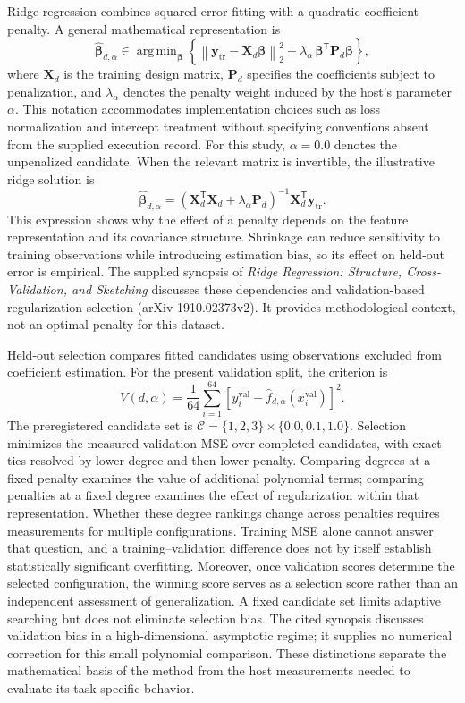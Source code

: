 \documentclass[11pt]{article}
\begin{document}
Ridge regression combines squared-error fitting with a quadratic coefficient penalty. A general mathematical representation is
\[
\widehat{\boldsymbol{\beta}}_{d,\alpha}
 \in \mathop{\mathrm{arg\,min}}_{\boldsymbol{\beta}}
 \left\{
 \left\|\mathbf{y}_{\mathrm{tr}}
       -\mathbf{X}_d\boldsymbol{\beta}\right\|_2^2
 +\lambda_{\alpha}\,
       \boldsymbol{\beta}^{\mathsf T}
       \mathbf{P}_d\boldsymbol{\beta}
 \right\},
\]
where \(\mathbf{X}_d\) is the training design matrix, \(\mathbf{P}_d\) specifies the coefficients subject to penalization, and \(\lambda_{\alpha}\) denotes the penalty weight induced by the host's parameter \(\alpha\). This notation accommodates implementation choices such as loss normalization and intercept treatment without specifying conventions absent from the supplied execution record. For this study, \(\alpha=0.0\) denotes the unpenalized candidate. When the relevant matrix is invertible, the illustrative ridge solution is
\[
\widehat{\boldsymbol{\beta}}_{d,\alpha}
 = \left(\mathbf{X}_d^{\mathsf T}\mathbf{X}_d
              +\lambda_{\alpha}\mathbf{P}_d\right)^{-1}
       \mathbf{X}_d^{\mathsf T}\mathbf{y}_{\mathrm{tr}}.
\]
This expression shows why the effect of a penalty depends on the feature representation and its covariance structure. Shrinkage can reduce sensitivity to training observations while introducing estimation bias, so its effect on held-out error is empirical. The supplied synopsis of \emph{Ridge Regression: Structure, Cross-Validation, and Sketching} discusses these dependencies and validation-based regularization selection (arXiv 1910.02373v2). It provides methodological context, not an optimal penalty for this dataset.

Held-out selection compares fitted candidates using observations excluded from coefficient estimation. For the present validation split, the criterion is
\[
V(d,\alpha)
 = \frac{1}{64}\sum_{i=1}^{64}
 \left[y_i^{\mathrm{val}}
       -\widehat f_{d,\alpha}(x_i^{\mathrm{val}})\right]^2.
\]
The preregistered candidate set is
\(\mathcal{C}=\{1,2,3\}\times\{0.0,0.1,1.0\}\).
Selection minimizes the measured validation MSE over completed candidates, with exact ties resolved by lower degree and then lower penalty. Comparing degrees at a fixed penalty examines the value of additional polynomial terms; comparing penalties at a fixed degree examines the effect of regularization within that representation. Whether these degree rankings change across penalties requires measurements for multiple configurations. Training MSE alone cannot answer that question, and a training--validation difference does not by itself establish statistically significant overfitting. Moreover, once validation scores determine the selected configuration, the winning score serves as a selection score rather than an independent assessment of generalization. A fixed candidate set limits adaptive searching but does not eliminate selection bias. The cited synopsis discusses validation bias in a high-dimensional asymptotic regime; it supplies no numerical correction for this small polynomial comparison. These distinctions separate the mathematical basis of the method from the host measurements needed to evaluate its task-specific behavior.
\end{document}
